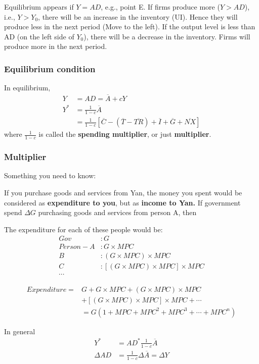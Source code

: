 \documentclass[12pt]{article}
\begin{document}
Equilibrium appears if $ Y = AD $, e.g., point E. If firms produce more ($ Y>AD $),
i.e., $ Y > Y_0 $, there will be an increase in the inventory (UI). Hence they will
produce less in the next period (Move to the left). If the output level is less than
AD (on the left side of $ Y_0 $), there will be a decrease in the inventory. Firms
will produce more in the next period.

\subsubsection{Equilibrium condition}
In equilibrium, 
\begin{align*}
Y &= AD =  \overline{A} + cY\\
Y^{*}&= \frac{1}{1 - c} \overline{A}\\
&= \frac{1}{1 - c}[ \overline{C} - ( \overline{T}  -  \overline{TR}) +  \overline{I} +  \overline{G} +  \overline{NX}]
\end{align*}
where $ \frac{1}{1 - c} $ is called the {\textbf {spending multiplier}}, or just
{\textbf {multiplier}}.


\subsubsection{Multiplier}
Something you need to know:

If you purchase goods and services from Yan, the money you spent would be
considered as {\textbf {expenditure to you}}, but as {\textbf {income to Yan.}} 
If government spend $ \Delta G $ purchasing goods and services from person A, then

The expenditure for each of these people would be:
\begin{align*}
Gov &: G\\
Person-A&:G  \times MPC\\
B&: (G  \times MPC) \times MPC\\
C&: [(G  \times  MPC)  \times MPC] \times MPC\\
\cdots
\end{align*}


\begin{align*}
Expend iture =& G + G  \times MPC + (G  \times MPC) \times MPC \\
&  + [(G  \times  MPC)  \times MPC] \times MPC + \cdots\\
&= G(1 + MPC + MPC^{2} + MPC^{3} + \cdots + MPC^{n})
\end{align*}

In general
\begin{align*}
Y^{*}&= AD^{*} \frac{1}{1 - c} \overline{A}\\
\Delta AD &= \frac{1}{1 - c} \Delta  \overline{A} = \Delta Y
\end{align*}
\end{document}
